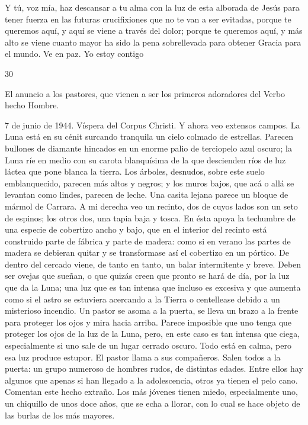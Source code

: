 \documentclass[12pt]{book} %
\begin{document}
Y tú, voz mía, haz descansar a tu alma con la luz de esta alborada de Jesús para tener fuerza en las futuras crucifixiones 
que no te van a ser evitadas, porque te queremos aquí, y aquí se viene a través del dolor; porque te queremos aquí, y más alto se viene cuanto mayor ha sido la pena sobrellevada para obtener Gracia para el mundo. Ve en paz. Yo estoy contigo 
 
 
30 
 
El anuncio a los pastores, que vienen a ser los primeros adoradores del Verbo hecho Hombre. 
 
7 de junio de 1944. Víspera del Corpus Christi. 
Y ahora veo extensos campos. La Luna está en su cénit surcando tranquila un cielo colmado de estrellas. Parecen 
bullones de diamante hincados en un enorme palio de terciopelo azul oscuro; la Luna ríe en medio con su carota blanquísima de la que descienden ríos de luz láctea que pone blanca la tierra. Los árboles, desnudos, sobre este suelo emblanquecido, parecen más altos y negros; y los muros bajos, que acá o allá se levantan como lindes, parecen de leche. Una casita lejana parece un bloque de mármol de Carrara. 
A mi derecha veo un recinto, dos de cuyos lados son un seto de espinos; los otros dos, una tapia baja y tosca. En ésta 
apoya la techumbre de una especie de cobertizo ancho y bajo, que en el interior del recinto está construido parte de fábrica y parte de madera: como si en verano las partes de madera se debieran quitar y se transformase así el cobertizo en un pórtico. De dentro del cercado viene, de tanto en tanto, un balar intermitente y breve. Deben ser ovejas que sueñan, o que quizás creen que pronto se hará de día, por la luz que da la Luna; una luz que es tan intensa que incluso es excesiva y que aumenta como si el astro se estuviera acercando a la Tierra o centellease debido a un misterioso incendio. 
Un pastor se asoma a la puerta, se lleva un brazo a la frente para proteger los ojos y mira hacia arriba. Parece imposible 
que uno tenga que proteger los ojos de la luz de la Luna, pero, en este caso es tan intensa que ciega, especialmente si uno sale de un lugar cerrado oscuro. Todo está en calma, pero esa luz produce estupor. 
El pastor llama a sus compañeros. Salen todos a la puerta: un grupo numeroso de hombres rudos, de distintas edades. 
Entre ellos hay algunos que apenas si han llegado a la adolescencia, otros ya tienen el pelo cano. Comentan este hecho extraño. Los más jóvenes tienen miedo, especialmente uno, un chiquillo de unos doce años, que se echa a llorar, con lo cual se hace objeto de las burlas de los más mayores. 
\end{document}
